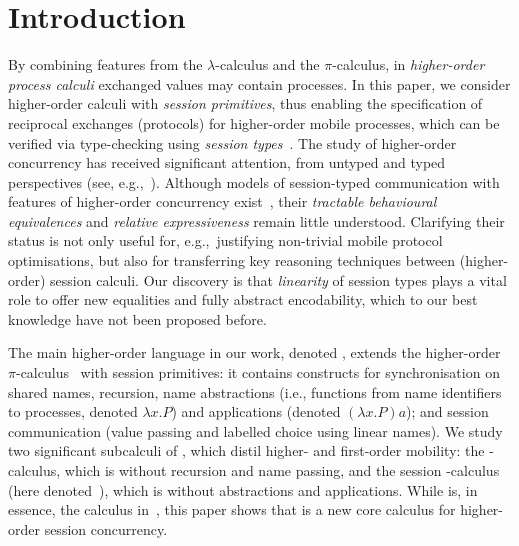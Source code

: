 \section{Introduction}
By combining features from the $\lambda$-calculus and the $\pi$-calculus, 
in \emph{higher-order process calculi} exchanged values may contain  processes. 
In this paper, we consider higher-order calculi with \emph{session primitives},
thus enabling the specification of reciprocal exchanges (protocols) 
for higher-order mobile processes, 
which can be verified via type-checking using \emph{session types}~\cite{honda.vasconcelos.kubo:language-primitives}.
The study of higher-order concurrency has received significant attention, 
from untyped and typed perspectives (see, e.g.,~\cite{ThomsenB:plachoasgcfhop,SangiorgiD:expmpa,San96int,JeffreyR05,MostrousY15,DBLP:journals/iandc/LanesePSS11,DBLP:conf/icalp/LanesePSS10,DBLP:conf/esop/KoutavasH11,XuActa2012}).
Although models of session-typed 
communication with features of higher-order concurrency exist~\cite{tlca07,DBLP:journals/jfp/GayV10},
their  \emph{tractable behavioural equivalences} and \emph{relative expressiveness}
remain little understood. 
Clarifying their status is not only useful for, 
e.g.,~justifying non-trivial mobile protocol
optimisations, but also for transferring key reasoning techniques
between (higher-order) session calculi. Our discovery 
is that \emph{linearity} of session types plays a vital role to 
offer new equalities and fully abstract encodability, 
which to our best knowledge have not been proposed before.   

The main higher-order language in our work, denoted \HOp,
extends the higher-order $\pi$-calculus~\cite{SangiorgiD:expmpa} with session primitives:
it contains constructs for synchronisation on shared names, 
recursion, 
name abstractions (i.e., functions from name identifiers  to processes, 
denoted $\lambda x.P$) and applications 
{(denoted $(\lambda x.P)a$)};
and session communication (value passing and
labelled choice using linear names). 
We study two significant subcalculi of \HOp, 
{which}
distil higher- and first-order mobility:
the \HO-calculus, which is \HOp without recursion and name passing, and 
the session \sessp-calculus {(here denoted~\sessp)}, which is \HOp without abstractions and applications.  
While \sessp is, 
in essence, the calculus in~\cite{honda.vasconcelos.kubo:language-primitives}, 
this paper shows that \HO  is a new core calculus 
for higher-order session concurrency.

